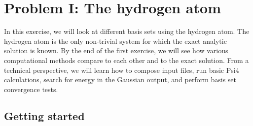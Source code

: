 
\section{Problem I: The hydrogen atom} %
\label{sec:problemI}

In this exercise, we will look at different basis sets using the hydrogen atom. 
The hydrogen atom is the only non-trivial system for which the exact analytic solution is known. 
By the end of the first exercise, we will see how various computational methods compare to each other and to the exact solution.  
From a technical perspective, we will learn how to compose input files, run basic Psi4 calculations, search for energy in the Gaussian output, and perform basis set convergence tests.

\subsection*{Getting started}

